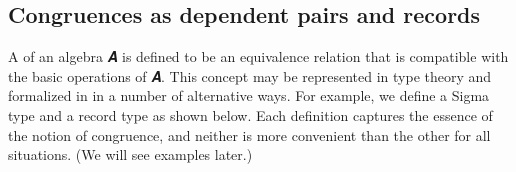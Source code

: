 \documentclass[a4paper,UKenglish,cleveref,autoref,thm-restate,11pt]{lipics-v2021}
\begin{document}
\subsection{Congruences as dependent pairs and records}
A  of an algebra \ab 𝑨 is defined to be an equivalence relation that is compatible with the basic operations of \ab 𝑨.  This concept may be represented in type theory and formalized in \agda in a number of alternative ways.  For example, we define a Sigma type  and a record type  as shown below. Each definition captures the essence of the notion of congruence, and neither is more convenient than the other for all situations. (We will see examples later.)
\ccpad
\begin{code}%
\>[0]\AgdaSpace{}%
\AgdaSymbol{:}\AgdaSpace{}%
\AgdaSymbol{\{}\AgdaSpace{}%
\AgdaSymbol{:}\AgdaSpace{}%
\AgdaSymbol{\}(}\AgdaSpace{}%
\AgdaSymbol{:}\AgdaSpace{}%
\AgdaSpace{}%
\AgdaSpace{}%
\AgdaSymbol{)}\AgdaSpace{}%
\AgdaSpace{}%
\AgdaSpace{}%
%
\<%
\\
\>[0]\AgdaSpace{}%
\AgdaSymbol{\{}\AgdaSymbol{\}}\AgdaSpace{}%
\AgdaSpace{}%
\AgdaSymbol{=}\AgdaSpace{}%
\AgdaSpace{}%
\AgdaSpace{}%
\AgdaSpace{}%
\AgdaSymbol{(}\AgdaSpace{}%
\AgdaSpace{}%
\AgdaSpace{}%
\AgdaSpace{}%
\AgdaSpace{}%
\AgdaSpace{}%
\AgdaSymbol{)}\AgdaSpace{}%
\AgdaFunction{,}\AgdaSpace{}%
\AgdaSpace{}%
\AgdaSpace{}%
\AgdaSpace{}%
\AgdaSpace{}%
\AgdaSpace{}%
\<%
\\
%
\\[\AgdaEmptyExtraSkip]%
\>[0]\AgdaSpace{}%
\AgdaSpace{}%
\AgdaSymbol{\{}\AgdaSpace{}%
\AgdaSpace{}%
\AgdaSymbol{:}\AgdaSpace{}%
\AgdaSymbol{\}}\AgdaSpace{}%
\AgdaSymbol{(}\AgdaSpace{}%
\AgdaSymbol{:}\AgdaSpace{}%
\AgdaSpace{}%
\AgdaSpace{}%
\AgdaSymbol{)}\AgdaSpace{}%
\AgdaSymbol{:}\AgdaSpace{}%
\AgdaSpace{}%
\AgdaSpace{}%
\AgdaSpace{}%

\end{code}
\end{document}
